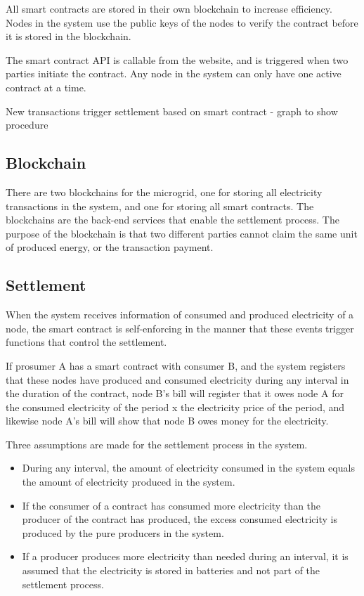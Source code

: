 All smart contracts are stored in their own blockchain to increase efficiency. Nodes in the system use the public keys of the nodes to verify the contract before it is stored in the blockchain.

The smart contract API is callable from the website, and is triggered when two parties initiate the contract. Any node in the system can only have one active contract at a time.

New transactions trigger settlement based on smart contract - graph to show procedure

\subsection{Blockchain}
There are two blockchains for the microgrid, one for storing all electricity transactions in the system, and one for storing all smart contracts. The blockchains are the back-end services that enable the settlement process. The purpose of the blockchain is that two different parties cannot claim the same unit of produced energy, or the transaction payment.

\subsection{Settlement}
When the system receives information of consumed and produced electricity of a node, the smart contract is self-enforcing in the manner that these events trigger functions that control the settlement. 

If prosumer A has a smart contract with consumer B, and the system registers that these nodes have produced and consumed electricity during any interval in the duration of the contract, node B's bill will register that it owes node A for the consumed electricity of the period x the electricity price of the period, and likewise node A's bill will show that node B owes money for the electricity. 

Three assumptions are made for the settlement process in the system.
\begin{itemize}
\item During any interval, the amount of electricity consumed in the system equals the amount of electricity produced in the system.
\item If the consumer of a contract has consumed more electricity than the producer of the contract has produced, the excess consumed electricity is produced by the pure producers in the system.
\item If a producer produces more electricity than needed during an interval, it is assumed that the electricity is stored in batteries and not part of the settlement process.
\end{itemize}

